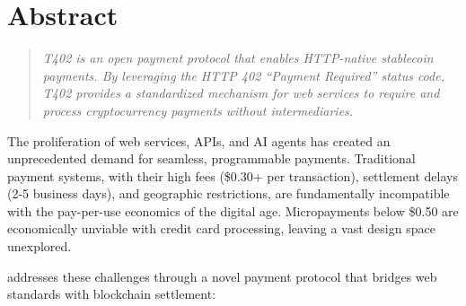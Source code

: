 \chapter*{Abstract}

\begin{quote}
\textit{T402 is an open payment protocol that enables HTTP-native stablecoin payments. By leveraging the HTTP 402 ``Payment Required'' status code, T402 provides a standardized mechanism for web services to require and process cryptocurrency payments without intermediaries.}
\end{quote}

\vspace{1em}

The proliferation of web services, APIs, and AI agents has created an unprecedented demand for seamless, programmable payments. Traditional payment systems, with their high fees (\$0.30+ per transaction), settlement delays (2-5 business days), and geographic restrictions, are fundamentally incompatible with the pay-per-use economics of the digital age. Micropayments below \$0.50 are economically unviable with credit card processing, leaving a vast design space unexplored.

\tprotocol{} addresses these challenges through a novel payment protocol that bridges web standards with blockchain settlement:

